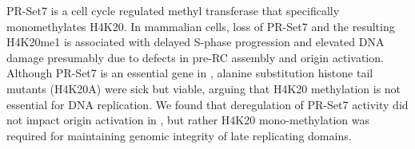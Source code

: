 PR-Set7 is a cell cycle regulated methyl transferase that specifically monomethylates H4K20\citep{Beck2012-uc}.  In mammalian cells, loss of PR-Set7 and the resulting H4K20me1 is associated with delayed S-phase progression and elevated DNA damage presumably due to defects in pre-RC assembly and origin activation\citep{Tardat2010-qc}.  %
Although PR-Set7 is an essential gene in \dros, alanine substitution histone tail mutants (H4K20A) were sick but viable\citep{McKay2015-nn}, arguing that H4K20 methylation is not essential for DNA replication. We found that deregulation of PR-Set7 activity did not impact origin activation in \dros, but rather H4K20 mono-methylation was required for maintaining genomic integrity of late replicating domains\citep{Li2016-fi}.    


